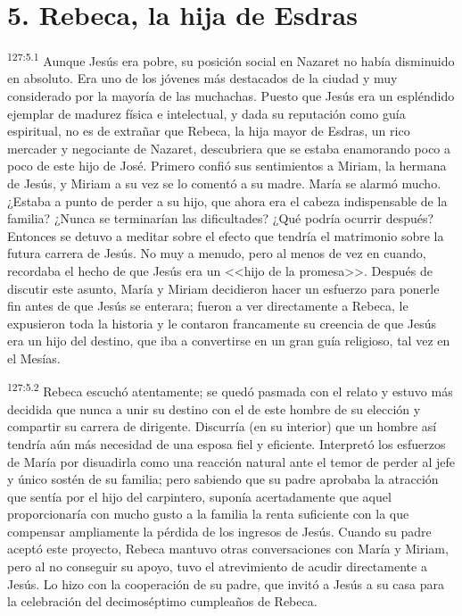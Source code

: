 \section*{5. Rebeca, la hija de Esdras}
\par 
\textsuperscript{127:5.1} Aunque Jesús era pobre, su posición social en Nazaret no había disminuido en absoluto. Era uno de los jóvenes más destacados de la ciudad y muy considerado por la mayoría de las muchachas. Puesto que Jesús era un espléndido ejemplar de madurez física e intelectual, y dada su reputación como guía espiritual, no es de extrañar que Rebeca, la hija mayor de Esdras, un rico mercader y negociante de Nazaret, descubriera que se estaba enamorando poco a poco de este hijo de José. Primero confió sus sentimientos a Miriam, la hermana de Jesús, y Miriam a su vez se lo comentó a su madre. María se alarmó mucho. ¿Estaba a punto de perder a su hijo, que ahora era el cabeza indispensable de la familia? ¿Nunca se terminarían las dificultades? ¿Qué podría ocurrir después? Entonces se detuvo a meditar sobre el efecto que tendría el matrimonio sobre la futura carrera de Jesús. No muy a menudo, pero al menos de vez en cuando, recordaba el hecho de que Jesús era un <<hijo de la promesa>>. Después de discutir este asunto, María y Miriam decidieron hacer un esfuerzo para ponerle fin antes de que Jesús se enterara; fueron a ver directamente a Rebeca, le expusieron toda la historia y le contaron francamente su creencia de que Jesús era un hijo del destino, que iba a convertirse en un gran guía religioso, tal vez en el Mesías.

\par 
\textsuperscript{127:5.2} Rebeca escuchó atentamente; se quedó pasmada con el relato y estuvo más decidida que nunca a unir su destino con el de este hombre de su elección y compartir su carrera de dirigente. Discurría (en su interior) que un hombre así tendría aún más necesidad de una esposa fiel y eficiente. Interpretó los esfuerzos de María por disuadirla como una reacción natural ante el temor de perder al jefe y único sostén de su familia; pero sabiendo que su padre aprobaba la atracción que sentía por el hijo del carpintero, suponía acertadamente que aquel proporcionaría con mucho gusto a la familia la renta suficiente con la que compensar ampliamente la pérdida de los ingresos de Jesús. Cuando su padre aceptó este proyecto, Rebeca mantuvo otras conversaciones con María y Miriam, pero al no conseguir su apoyo, tuvo el atrevimiento de acudir directamente a Jesús. Lo hizo con la cooperación de su padre, que invitó a Jesús a su casa para la celebración del decimoséptimo cumpleaños de Rebeca.


